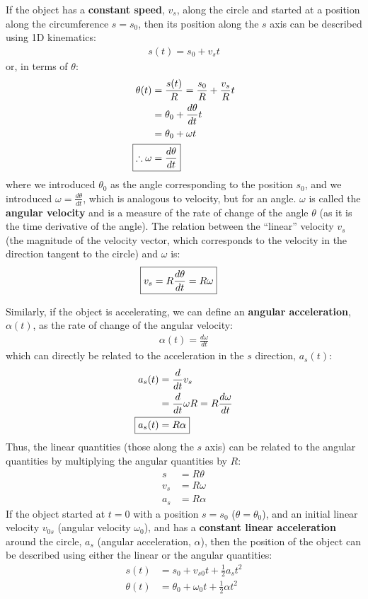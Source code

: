 If the object has a \textbf{constant speed}, $v_s$, along the circle and started at a position along the circumference $s=s_0$, then its position along the $s$ axis can be described using 1D kinematics:
\begin{align*}
s(t)=s_0+v_st
\end{align*}
or, in terms of $\theta$:
\begin{align*}
\theta(t)&=\frac{s(t)}{R}=\frac{s_0}{R}+\frac{v_s}{R}t\\
&=\theta_0 + \frac{d\theta}{dt}t\\
&=\theta_0 + \omega t\\
\Aboxed{\therefore \omega &= \frac{d\theta}{dt}}
\end{align*}
where we introduced $\theta_0$ as the angle corresponding to the position $s_0$, and we introduced $\omega=\frac{d\theta}{dt}$, which is analogous to velocity, but for an angle. $\omega$ is called the \textbf{angular velocity} and is a measure of the rate of change of the angle $\theta$ (as it is the time derivative of the angle). The relation between the ``linear'' velocity $v_s$ (the magnitude of the velocity vector, which corresponds to the velocity in the direction tangent to the circle) and $\omega$ is:
\begin{align*}
\Aboxed{v_s=R\frac{d\theta}{dt}=R\omega }
\end{align*}

Similarly, if the object is accelerating, we can define an \textbf{angular acceleration}, $\alpha(t)$, as the rate of change of the angular velocity:
\begin{align*}
\alpha(t)=\frac{d\omega}{dt}
\end{align*}
which can directly be related to the acceleration in the $s$ direction, $a_s(t)$:
\begin{align*}
a_s(t) &= \frac{d}{dt}v_s\\
&=\frac{d}{dt}\omega R=R\frac{d\omega}{dt}\\
\Aboxed{a_s(t)&=R\alpha }
\end{align*}
Thus, the linear quantities (those along the $s$ axis) can be related to the angular quantities by multiplying the angular quantities by $R$:
\begin{align}
s&=R\theta\\
v_s&=R\omega\\
a_s&=R\alpha
\end{align}
If the object started at $t=0$ with a position $s=s_0$ ($\theta=\theta_0$), and an initial linear velocity $v_{0s}$ (angular velocity $\omega_0$), and has a \textbf{constant linear acceleration} around the circle, $a_s$ (angular acceleration, $\alpha$), then the position of the object can be described using either the linear or the angular quantities:
\begin{align*}
s(t) &= s_0+v_{s0}t+\frac{1}{2}a_s t^2\\
\theta(t) &= \theta_0+\omega_0t+\frac{1}{2}\alpha t^2
\end{align*}

